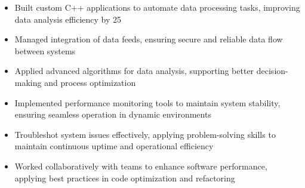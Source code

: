 \par\smallskip
\noindent
\begin{minipage}{20cm}
  \begin{minipage}{9.75cm}
    \begin{itemize}
      \item Built custom C++ applications to automate data processing tasks, improving data analysis efficiency by 25%
      \item Managed integration of data feeds, ensuring secure and reliable data flow between systems
      \item Applied advanced algorithms for data analysis, supporting better decision-making and process optimization
    \end{itemize}
  \end{minipage}
  \hfill
  \begin{minipage}{9.75cm}
    \begin{itemize}
      \item Implemented performance monitoring tools to maintain system stability, ensuring seamless operation in dynamic environments
      \item Troubleshot system issues effectively, applying problem-solving skills to maintain continuous uptime and operational efficiency
      \item Worked collaboratively with teams to enhance software performance, applying best practices in code optimization and refactoring
    \end{itemize}
  \end{minipage}
\end{minipage}
\par\smallskip
\divider

